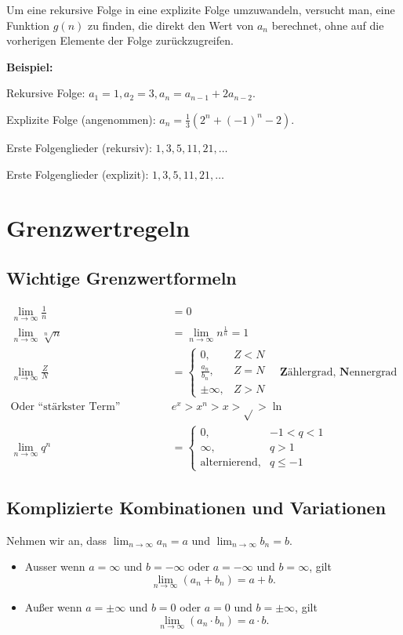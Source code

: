 \documentclass[11pt, openany]{book}
\begin{document}
Um eine rekursive Folge in eine explizite Folge umzuwandeln, versucht man, eine Funktion $g(n)$ zu finden, die direkt den Wert von $a_n$ berechnet, ohne auf die vorherigen Elemente der Folge zurückzugreifen.

\textbf{Beispiel:}

Rekursive Folge: $a_1 = 1, a_2 = 3, a_n = a_{n-1} + 2a_{n-2}$.

Explizite Folge (angenommen): $a_n = \frac{1}{3}(2^n + (-1)^n - 2)$.

Erste Folgenglieder (rekursiv): $1, 3, 5, 11, 21, \dots$

Erste Folgenglieder (explizit): $1, 3, 5, 11, 21, \dots$

\section{Grenzwertregeln}

\subsection{Wichtige Grenzwertformeln}
\begin{tcolorbox}
\begin{align*}
\lim_{n \to \infty} \frac{1}{n} &= 0 \\
\lim_{n \to \infty} \sqrt[n]{n} &= \lim_{n \to \infty} n^{\frac{1}{n}} = 1 \\
\lim_{n \to \infty} \frac{Z}{N} &= \begin{cases}
  0, & Z < N \\
  \frac{a_n}{b_n}, & Z = N \\
  \pm \infty, & Z > N
\end{cases} \quad \textbf{Z} \text{ählergrad, } \textbf{N} \text{ennergrad}\\
\text{Oder ``stärkster Term'' gewinnt: } & e^x > x^n > x > \sqrt{} > \ln{} \\
\lim_{n \to \infty} q^n &= \begin{cases}
  0, & -1 < q < 1 \\
  \infty, & q > 1 \\
  \text{alternierend}, & q \leq -1
\end{cases}
\end{align*}
\end{tcolorbox}

\subsection{Komplizierte Kombinationen und Variationen}
Nehmen wir an, dass $\lim_{n \to \infty} a_n = a$ und $\lim_{n \to \infty} b_n = b$.
\begin{itemize}
    \item Ausser wenn $a = \infty$ und $b = -\infty$ oder $a = -\infty$ und $b = \infty$, gilt
    \[
        \lim_{n \to \infty} (a_n + b_n) = a + b.
    \]
    \item Außer wenn $a = \pm\infty$ und $b = 0$ oder $a = 0$ und $b = \pm\infty$, gilt
    \[
        \lim_{n \to \infty} (a_n \cdot b_n) = a \cdot b.
    \]
\end{itemize}
\end{document}
